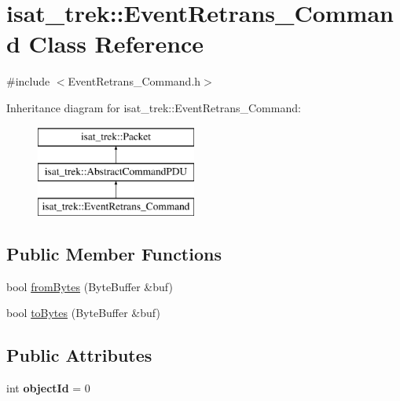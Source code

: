 \hypertarget{classisat__trek_1_1_event_retrans___command}{}\section{isat\+\_\+trek\+:\+:Event\+Retrans\+\_\+\+Command Class Reference}
\label{classisat__trek_1_1_event_retrans___command}


{\ttfamily \#include $<$Event\+Retrans\+\_\+\+Command.\+h$>$}

Inheritance diagram for isat\+\_\+trek\+:\+:Event\+Retrans\+\_\+\+Command\+:\begin{figure}[H]
\begin{center}
\leavevmode
\includegraphics[height=3.000000cm]{classisat__trek_1_1_event_retrans___command}
\end{center}
\end{figure}
\subsection*{Public Member Functions}
\begin{DoxyCompactItemize}
\item 
bool \hyperlink{classisat__trek_1_1_event_retrans___command_a54fbca0dd27fbb2a44718b160caeb266}{from\+Bytes} (Byte\+Buffer \&buf)
\item 
bool \hyperlink{classisat__trek_1_1_event_retrans___command_ae989b246384d73d1c4cac682672676a3}{to\+Bytes} (Byte\+Buffer \&buf)
\end{DoxyCompactItemize}
\subsection*{Public Attributes}
\begin{DoxyCompactItemize}
\item 
int {\bfseries object\+Id} = 0\hypertarget{classisat__trek_1_1_event_retrans___command_a6b6df7f1ca81ef01d8ef8db6dd1a8ff3}{}\label{classisat__trek_1_1_event_retrans___command_a6b6df7f1ca81ef01d8ef8db6dd1a8ff3}

\end{DoxyCompactItemize}


